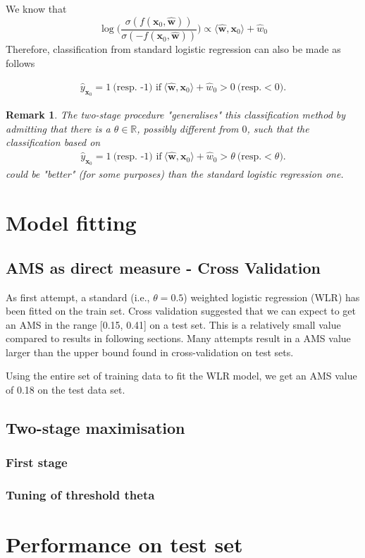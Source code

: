 \documentclass[]{article}
\newcommand{\w}{\mathbf{w}}
\newcommand{\x}{\mathbf{x}}
\newtheorem{remark}[theorem]{Remark}
\begin{document}
We know that $$\log \Big( \frac{\sigma(f(\x_0,\hat{\w}))}{\sigma(-f(\x_0,\hat{\w}))}\Big)\propto \langle\hat{\w},\x_0\rangle+\hat{w}_0$$
Therefore, classification from standard logistic regression can also be made as follows

\begin{align*}
\hat{y}_{\x_0}=1 \ \text{(resp. -1) if}\ \langle\hat{\w},\x_0\rangle+\hat{w}_0>0 \  \text{(resp.} <0).
\end{align*}

\begin{remark}
The two-stage procedure "generalises" this classification method by admitting that there is a $\theta\in \mathbb{R}$, possibly different from $0$, such that the classification based on 
\begin{align*}
\hat{y}_{\x_0}=1 \ \text{(resp. -1) if}\ \langle\hat{\w},\x_0\rangle+\hat{w}_0>\theta \  \text{(resp.} <\theta).
\end{align*}
could be "better" (for some purposes) than the standard logistic regression one. 
\end{remark}


\section{Model fitting}

\subsection{AMS as direct measure - Cross Validation}

As first attempt, a standard (i.e., $\theta=0.5$) weighted logistic regression (WLR) has been fitted on the train set. Cross validation suggested that we can expect to get an AMS in the range [0.15, 0.41] on a test set. This is a relatively small value compared to results in following sections. Many attempts result in a AMS value larger than the upper bound found in cross-validation on test sets.

Using the entire set of training data to fit the WLR model, we get an AMS value of 0.18 on the test data set.

\subsection{Two-stage maximisation}


\subsubsection{First stage}
\subsubsection{Tuning of threshold theta}


\section{Performance on test set}



\end{document}
